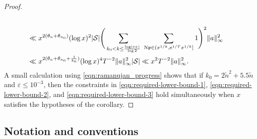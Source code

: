 \documentclass[11pt]{amsart}
\theoremstyle{remark}
\numberwithin{equation}{section}
\newcommand{\p}{\mathfrak{p}}
\newcommand{\N}{\textnormal{N}}
\newcommand{\mS}{\mathcal{S}}
\newcommand{\eps}{\varepsilon}
\renewcommand{\tilde}{\widetilde}
\begin{document}
\begin{proof}
\[\begin{aligned}
    \\
    &\ll  x^{2(\theta_n+\theta_{n_0})} (\log x)^2 |\mS|
    \Bigg(\sum_{k_0 < k \le \frac{\log(ex)}{\log 2}}~\sum_{\N \p \in (x^{1/k}, e^{1/T} x^{1/k}]} 1 \Bigg)^2 \|a\|_\infty^2 
    \\
    &\ll  x^{2(\theta_n+\theta_{n_0} + \frac{1}{k_0})} (\log x)^4 T^{-2} \|a\|_\infty^2 |\mS|\ll x^2 T^{-2} \|a\|_\infty^2.
\end{aligned}
\]
A small calculation using \eqref{eqn:ramanujan_progress} shows that if $k_0 = 2\tilde{n}^2 + 5.5\tilde{n}$ and $\eps \leq 10^{-3}$, then the constraints in \eqref{eqn:required-lower-bound-1}, \eqref{eqn:required-lower-bound-2}, and \eqref{eqn:required-lower-bound-3} hold simultaneously when $x$ satisfies the hypotheses of the corollary.
\end{proof}

\subsection{Notation and conventions}
\label{subsec:notation_LFZDE}
\end{document}
